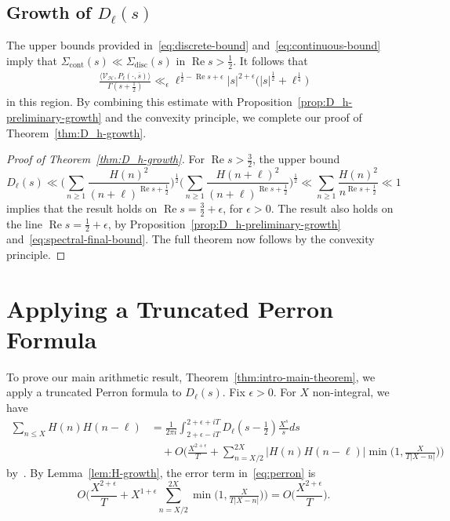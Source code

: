 \documentclass[11pt,reqno]{amsart}
\theoremstyle{plain}
\theoremstyle{definition}
\numberwithin{equation}{section}
\renewcommand{\Re}{\operatorname{Re}}
\begin{document}
\subsection{Growth of \texorpdfstring{$D_\ell(s)$}{Dh}}

The upper bounds provided in~\eqref{eq:discrete-bound} and~\eqref{eq:continuous-bound} imply that $\Sigma_{\mathrm{cont}}(s) \ll \Sigma_{\mathrm{disc}}(s)$ in $\Re s > \frac{1}{2}$. It follows that
\begin{align} \label{eq:spectral-final-bound}
	\frac{\langle \mathcal{V}_\mathcal{H}, P_\ell(\cdot, \overline{s}) \rangle}{\Gamma(s+\frac{1}{2})}
	\ll_\epsilon \ell^{\frac{1}{2} - \Re s + \epsilon} \vert s \vert^{2+\epsilon}
	\big( \vert s \vert^{\frac{1}{2}} + \ell^{\frac{1}{4}} \big)
\end{align}
in this region. By combining this estimate with Proposition~\ref{prop:D_h-preliminary-growth} and the convexity principle, we complete our proof of Theorem~\ref{thm:D_h-growth}.

\begin{proof}[Proof of Theorem~\ref{thm:D_h-growth}]
For $\Re s > \frac{3}{2}$, the upper bound
\[
	D_\ell(s) 
	\ll \Big(\sum_{n \geq 1} \frac{H(n)^2}{(n+\ell)^{\Re s + \frac{1}{2}}}\Big)^\frac{1}{2}
		\Big(\sum_{n \geq 1} \frac{H(n+\ell)^2}{(n+\ell)^{\Re s + \frac{1}{2}}}\Big)^\frac{1}{2}
	\ll \sum_{n \geq 1} \frac{H(n)^2}{n^{\Re s + \frac{1}{2}}}
	\ll 1
\]
implies that the result holds on $\Re s = \frac{3}{2} + \epsilon$, for $\epsilon > 0$. The result also holds on the line $\Re s = \frac{1}{2} + \epsilon$, by Proposition~\ref{prop:D_h-preliminary-growth} and~\eqref{eq:spectral-final-bound}. The full theorem now follows by the convexity principle.
\end{proof}


\section{Applying a Truncated Perron Formula} \label{sec:perron}

To prove our main arithmetic result, Theorem~\ref{thm:intro-main-theorem}, we apply a truncated Perron formula to $D_\ell(s)$. Fix $\epsilon > 0$. For $X$ non-integral, we have
\begin{align} \label{eq:perron}
	\sum_{n \leq X} H(n) H(n-\ell)
		& = \frac{1}{2\pi i} \int_{2+\epsilon-i T}^{2+\epsilon+ i T} D_\ell(s-\tfrac{1}{2}) \frac{X^s}{s} ds \\
		& \quad
		+ O\Big(\frac{X^{2+\epsilon}}{T}
		+ \!\! \sum_{n=X/2}^{2X} \!\!
			\vert H(n)H(n-\ell)\vert \min\big(1,\tfrac{X}{T \vert X-n \vert}\big)\Big)
\end{align}
by~\cite[Corollary 5.3]{MontgomeryVaughn06}. By Lemma~\ref{lem:H-growth}, the error term in~\eqref{eq:perron} is
\[
	O\Big( \frac{X^{2+\epsilon}}{T} + 
	X^{1+\epsilon} \sum_{n=X/2}^{2X} \min\big(1,\tfrac{X}{T \vert X-n \vert}\big)\Big)
	= O\Big( \frac{X^{2+\epsilon}}{T} \Big).
\]
\end{document}
